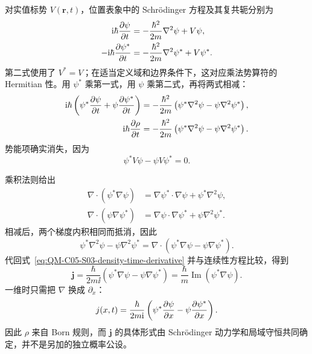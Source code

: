 

对实值标势 $V(\mathbf r,t)$，位置表象中的 Schr\"odinger 方程及其复共轭分别为
\begin{align}
  \mathrm{i}\hbar\frac{\partial \psi}{\partial t}
  &=-\frac{\hbar^2}{2m}\nabla^2\psi+V\psi,
  \label{eq:QM-C05-S03-schrodinger}\\
  -\mathrm{i}\hbar\frac{\partial \psi^*}{\partial t}
  &=-\frac{\hbar^2}{2m}\nabla^2\psi^*+V\psi^*.
  \label{eq:QM-C05-S03-conjugate-schrodinger}
\end{align}
第二式使用了 $V^*=V$；在适当定义域和边界条件下，这对应乘法势算符的 Hermitian 性。用 $\psi^*$ 乘第一式，用 $\psi$ 乘第二式，再将两式相减：
\begin{align}
  \mathrm{i}\hbar
  \left(
    \psi^*\frac{\partial \psi}{\partial t}
    +\psi\frac{\partial \psi^*}{\partial t}
  \right)
  &=-\frac{\hbar^2}{2m}
  \left(
    \psi^*\nabla^2\psi
    -\psi\nabla^2\psi^*
  \right),\\
  \mathrm{i}\hbar\frac{\partial \rho}{\partial t}
  &=-\frac{\hbar^2}{2m}
  \left(
    \psi^*\nabla^2\psi
    -\psi\nabla^2\psi^*
  \right).
  \label{eq:QM-C05-S03-density-time-derivative}
\end{align}
势能项确实消失，因为
\begin{equation}
  \psi^*V\psi-\psi V\psi^*=0.
  \label{eq:QM-C05-S03-potential-cancellation}
\end{equation}

乘积法则给出
\begin{align}
  \nabla\cdot(\psi^*\nabla\psi)
  &=\nabla\psi^*\cdot\nabla\psi+\psi^*\nabla^2\psi,\\
  \nabla\cdot(\psi\nabla\psi^*)
  &=\nabla\psi\cdot\nabla\psi^*+\psi\nabla^2\psi^*.
\end{align}
相减后，两个梯度内积相同而抵消，因此
\begin{equation}
  \psi^*\nabla^2\psi-\psi\nabla^2\psi^*
  =\nabla\cdot
  (\psi^*\nabla\psi-\psi\nabla\psi^*).
  \label{eq:QM-C05-S03-divergence-identity}
\end{equation}
代回式~\eqref{eq:QM-C05-S03-density-time-derivative} 并与连续性方程比较，得到
\begin{equation}
  \boxed{
  \mathbf j
  =\frac{\hbar}{2m\ii}
  (\psi^*\nabla\psi-\psi\nabla\psi^*)
  =\frac{\hbar}{m}\operatorname{Im}(\psi^*\nabla\psi)}.
  \label{eq:QM-C05-S03-probability-current}
\end{equation}
一维时只需把 $\nabla$ 换成 $\partial_x$：
\begin{equation}
  j(x,t)=\frac{\hbar}{2m\mathrm{i}}
  \left(
    \psi^*\frac{\partial \psi}{\partial x}
    -\psi\frac{\partial \psi^*}{\partial x}
  \right).
  \label{eq:QM-C05-S03-current-one-dimensional}
\end{equation}
因此 $\rho$ 来自 Born 规则，而 $\mathbf j$ 的具体形式由 Schr\"odinger 动力学和局域守恒共同确定，并不是另加的独立概率公设。

